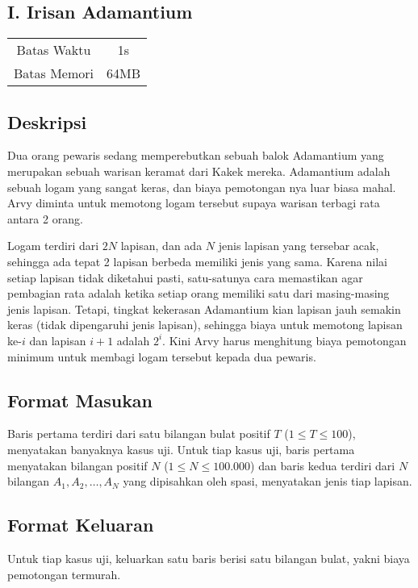 \documentclass{article}
\begin{document}
\begin{center}
    \section*{I. Irisan Adamantium} %

    \begin{tabular}{ | c c | }
        \hline
        Batas Waktu  & 1s \\    %
        Batas Memori & 64MB \\  %
        \hline
    \end{tabular}
\end{center}

\subsection*{Deskripsi}
Dua orang pewaris sedang memperebutkan sebuah balok Adamantium yang merupakan sebuah warisan keramat dari Kakek mereka.
Adamantium adalah sebuah logam yang sangat keras, dan biaya pemotongan nya luar biasa mahal.
Arvy diminta untuk memotong logam tersebut supaya warisan terbagi rata antara 2 orang.

Logam terdiri dari $2N$ lapisan, dan ada $N$ jenis lapisan yang tersebar acak, sehingga ada tepat 2 lapisan berbeda memiliki jenis yang sama.
Karena nilai setiap lapisan tidak diketahui pasti, satu-satunya cara memastikan agar pembagian rata adalah ketika setiap orang memiliki satu dari masing-masing jenis lapisan.
Tetapi, tingkat kekerasan Adamantium kian lapisan jauh semakin keras (tidak dipengaruhi jenis lapisan), sehingga biaya untuk memotong lapisan ke-$i$ dan lapisan $i+1$ adalah $2^i$.
Kini Arvy harus menghitung biaya pemotongan minimum untuk membagi logam tersebut kepada dua pewaris.

\subsection*{Format Masukan}
Baris pertama terdiri dari satu bilangan bulat positif $T$ ($1 \leq T \leq 100$), menyatakan banyaknya kasus uji.
Untuk tiap kasus uji, baris pertama menyatakan bilangan positif $N$ ($1 \leq N \leq 100.000$) dan baris kedua terdiri dari $N$ bilangan $A_1, A_2, \dots, A_N$ yang dipisahkan oleh spasi, menyatakan jenis tiap lapisan.

\subsection*{Format Keluaran}
Untuk tiap kasus uji, keluarkan satu baris berisi satu bilangan bulat, yakni biaya pemotongan termurah.
\\
\end{document}
